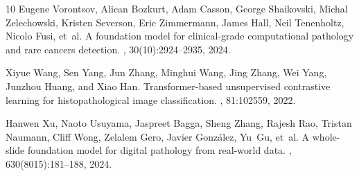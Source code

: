 \documentclass[11pt,a4paper]{article}
\begin{document}
\begin{thebibliography}{10}
Eugene Vorontsov, Alican Bozkurt, Adam Casson, George Shaikovski, Michal
  Zelechowski, Kristen Severson, Eric Zimmermann, James Hall, Neil Tenenholtz,
  Nicolo Fusi, et~al.
\newblock A foundation model for clinical-grade computational pathology and
  rare cancers detection.
, 30(10):2924--2935, 2024.

Xiyue Wang, Sen Yang, Jun Zhang, Minghui Wang, Jing Zhang, Wei Yang, Junzhou
  Huang, and Xiao Han.
\newblock Transformer-based unsupervised contrastive learning for
  histopathological image classification.
, 81:102559, 2022.

Hanwen Xu, Naoto Usuyama, Jaspreet Bagga, Sheng Zhang, Rajesh Rao, Tristan
  Naumann, Cliff Wong, Zelalem Gero, Javier Gonz{\'a}lez, Yu~Gu, et~al.
\newblock A whole-slide foundation model for digital pathology from real-world
  data.
, 630(8015):181--188, 2024.

\end{thebibliography}
\end{document}
